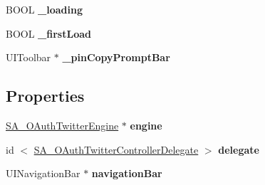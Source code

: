 \begin{DoxyCompactItemize}
\item 
\hypertarget{interface_s_a___o_auth_twitter_controller_aefb7d6b5b3aa3edefd183a2162cdd250}{
\-B\-O\-O\-L {\bfseries \-\_\-loading}}
\label{interface_s_a___o_auth_twitter_controller_aefb7d6b5b3aa3edefd183a2162cdd250}

\item 
\hypertarget{interface_s_a___o_auth_twitter_controller_ab42a45a98178a1e133a7c5aba4c02a10}{
\-B\-O\-O\-L {\bfseries \-\_\-first\-Load}}
\label{interface_s_a___o_auth_twitter_controller_ab42a45a98178a1e133a7c5aba4c02a10}

\item 
\hypertarget{interface_s_a___o_auth_twitter_controller_a947ce6c9da7ba8e4bc1d8f2ddc4fb883}{
\-U\-I\-Toolbar $\ast$ {\bfseries \-\_\-pin\-Copy\-Prompt\-Bar}}
\label{interface_s_a___o_auth_twitter_controller_a947ce6c9da7ba8e4bc1d8f2ddc4fb883}

\end{DoxyCompactItemize}
\subsection*{\-Properties}
\begin{DoxyCompactItemize}
\item 
\hypertarget{interface_s_a___o_auth_twitter_controller_a54144a7a73da4909bd8389f535055bb9}{
\hyperlink{interface_s_a___o_auth_twitter_engine}{\-S\-A\-\_\-\-O\-Auth\-Twitter\-Engine} $\ast$ {\bfseries engine}}
\label{interface_s_a___o_auth_twitter_controller_a54144a7a73da4909bd8389f535055bb9}

\item 
\hypertarget{interface_s_a___o_auth_twitter_controller_a1d1abde027dd908d19c8557cbb47a54f}{
id\*
$<$ \hyperlink{protocol_s_a___o_auth_twitter_controller_delegate-p}{\-S\-A\-\_\-\-O\-Auth\-Twitter\-Controller\-Delegate} $>$ {\bfseries delegate}}
\label{interface_s_a___o_auth_twitter_controller_a1d1abde027dd908d19c8557cbb47a54f}

\item 
\hypertarget{interface_s_a___o_auth_twitter_controller_a62628809aaadc60c6d9378b1e2598a46}{
\-U\-I\-Navigation\-Bar $\ast$ {\bfseries navigation\-Bar}}
\label{interface_s_a___o_auth_twitter_controller_a62628809aaadc60c6d9378b1e2598a46}

\end{DoxyCompactItemize}


